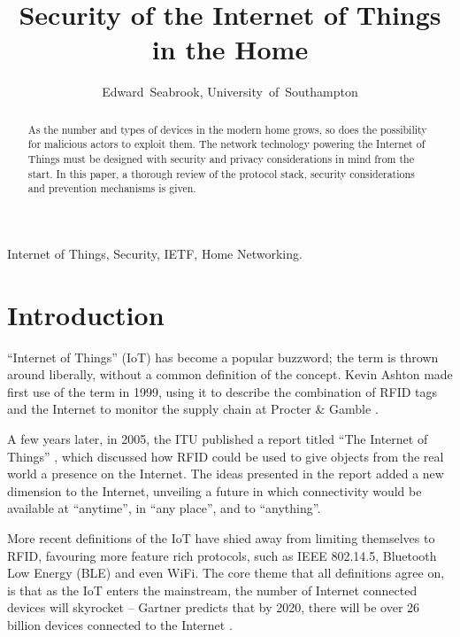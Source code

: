 \documentclass[10pt,journal,compsoc]{IEEEtran}
\begin{document}
\title{Security of the Internet of Things in the Home}
\author{Edward~Seabrook, University~of~Southampton }

\maketitle

\begin{abstract}
As the number and types of devices in the modern home grows, so does the
possibility for malicious actors to exploit them. The network technology
powering the Internet of Things must be designed with security and privacy
considerations in mind from the start. In this paper, a thorough review of the
protocol stack, security considerations and prevention mechanisms is given. 
\end{abstract}

\begin{IEEEkeywords}
Internet of Things, Security, IETF, Home Networking.
\end{IEEEkeywords}

\IEEEpeerreviewmaketitle

\section{Introduction}
 ``Internet of Things'' (IoT) has become a popular buzzword;
the term is thrown around liberally, without a common definition of the
concept. Kevin Ashton made first use of the term in 1999, using it to
describe the combination of RFID tags and the Internet to monitor the supply
chain at Procter \& Gamble \cite{Ashton2009}. 

A few years later, in 2005, the ITU published a report titled ``The Internet of
Things'' \cite{ITU_IoT}, which discussed how RFID could be used to give objects
from the real world a presence on the Internet. The ideas presented in the
report added a new dimension to the Internet, unveiling a future in which
connectivity would be available at ``anytime'', in ``any place'', and to
``anything''.

More recent definitions of the IoT have shied away from limiting themselves to
RFID, favouring more feature rich protocols, such as IEEE 802.14.5, Bluetooth
Low Energy (BLE) and even WiFi. The core theme that all definitions agree on,
is that as the IoT enters the mainstream, the number of Internet connected
devices will skyrocket -- Gartner predicts that by 2020, there will be over 26
billion devices connected to the Internet \cite{Gartner2014}. 
\end{document}
